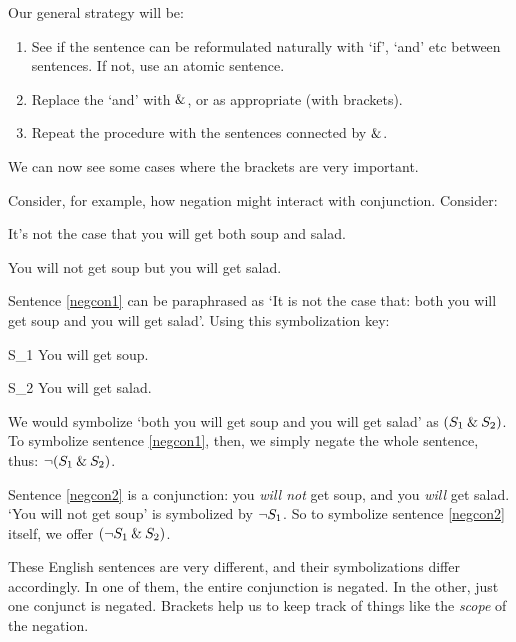 
Our general strategy will be:
\begin{enumerate}
\item See if the sentence can be reformulated naturally with `if', `and' etc between sentences. If not, use an atomic sentence.
\item Replace the `and' with $\mathbin{\&}$, or as appropriate (with brackets).
\item Repeat the procedure with the sentences connected by $\mathbin{\&}$. 
\end{enumerate}


We can now see some cases where the brackets are very important. 

Consider, for example, how negation might interact with conjunction. Consider:
	\begin{earg}
		\item[\ex{negcon1}] It's not the case that you will get both soup and salad.
		\item[\ex{negcon2}] You will not get soup but you will get salad.
	\end{earg}
Sentence \ref{negcon1} can be paraphrased as `It is not the case that: both you will get soup and you will get salad'. Using this symbolization key:
	\begin{ekey}
		\item[S_1] You will get soup.
		\item[S_2] You will get salad.
	\end{ekey}
We would symbolize `both you will get soup and you will get salad' as $(S_1 \mathbin{\&} S_2)$. To symbolize sentence \ref{negcon1}, then, we simply negate the whole sentence, thus: $\neg (S_1 \mathbin{\&} S_2)$. 

Sentence \ref{negcon2} is a conjunction: you \emph{will not} get soup, and you \emph{will} get salad. `You will not get soup' is symbolized by $\neg S_1$. So to symbolize sentence \ref{negcon2} itself, we offer $(\neg S_1 \mathbin{\&} S_2)$. 

These English sentences are very different, and their symbolizations differ accordingly. In one of them, the entire conjunction is negated. In the other, just one conjunct is negated. Brackets help us to keep track of things like the \emph{scope} of the negation. 
%




